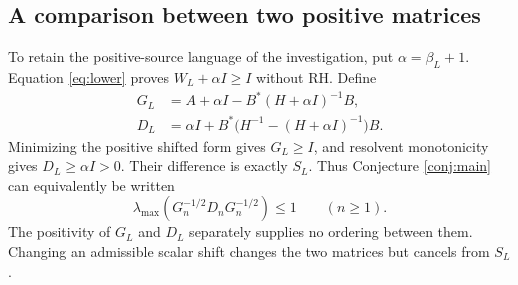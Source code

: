 \subsection{A comparison between two positive matrices}
To retain the positive-source language of the investigation, put
$\alpha=\beta_L+1$. Equation \eqref{eq:lower} proves
$W_L+\alpha I\ge I$ without RH. Define
\begin{align}
G_L&=A+\alpha I-B^*(H+\alpha I)^{-1}B,\label{eq:G}\\
D_L&=\alpha I+B^*\bigl(H^{-1}-(H+\alpha I)^{-1}\bigr)B.\label{eq:D}
\end{align}
Minimizing the positive shifted form gives $G_L\ge I$, and resolvent
monotonicity gives $D_L\ge\alpha I>0$. Their difference is exactly $S_L$.
Thus Conjecture \ref{conj:main} can equivalently be written
\begin{equation}\label{eq:contraction}
\lambda_{\max}(G_n^{-1/2}D_nG_n^{-1/2})\le1\qquad(n\ge1).
\end{equation}
The positivity of $G_L$ and $D_L$ separately supplies no ordering between
them. Changing an admissible scalar shift changes the two matrices but
cancels from $S_L$.

